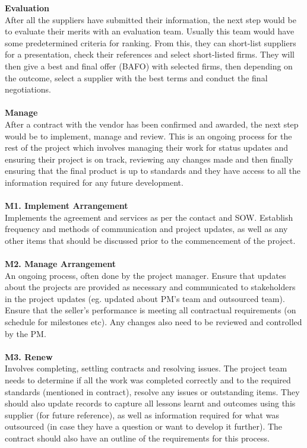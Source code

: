 \documentclass[a4paper,10pt]{article}
\begin{document}
\textcolor{BlueGreen}{\textbf{Evaluation}} \\
After all the suppliers have submitted their information, the next step would be to evaluate their merits with an evaluation team. Usually this team would have some predetermined criteria for ranking. From this, they can short-list suppliers for a presentation, check their references and select short-listed firms. They will then give a best and final offer (BAFO) with selected firms, then depending on the outcome, select a supplier with the best terms and conduct the final negotiations. \\\\
\newpage
\noindent \textcolor{BlueGreen}{\textbf{Manage}} \\
After a contract with the vendor has been confirmed and awarded, the next step would be to implement, manage and review. This is an ongoing process for the rest of the project which involves managing their work for status updates and ensuring their project is on track, reviewing any changes made and then finally ensuring that the final product is up to standards and they have access to all the information required for any future development. \\\\
\textbf{M1. Implement Arrangement} \\ 
Implements the agreement and services as per the contact and SOW. Establish frequency and methods of communication and project updates, as well as any other items that should be discussed prior to the commencement of the project. \\\\
\textbf{M2. Manage Arrangement} \\
An ongoing process, often done by the project manager. Ensure that updates about the projects are provided as necessary and communicated to stakeholders in the project updates (eg. updated about PM's team and outsourced team). Ensure that the seller's performance is meeting all contractual requirements (on schedule for milestones etc). Any changes also need to be reviewed and controlled by the PM. \\\\
\textbf{M3. Renew} \\
Involves completing, settling contracts and resolving issues. The project team needs to determine if all the work was completed correctly and to the required standards (mentioned in contract), resolve any issues or outstanding items. They should also update records to capture all lessons learnt and outcomes using this supplier (for future reference), as well as information required for what was outsourced (in case they have a question or want to develop it further). The contract should also have an outline of the requirements for this process. \\\\
\end{document}
